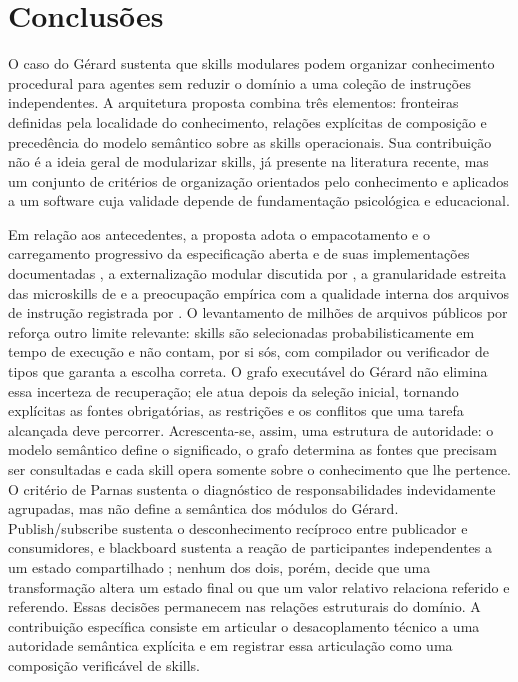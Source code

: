 \documentclass[preprint,12pt,authoryear]{elsarticle}
\newcommand{\gerard}{Gérard\xspace}
\begin{document}
\section{Conclusões}
O caso do \gerard{} sustenta que skills modulares podem organizar conhecimento procedural para agentes sem reduzir o domínio a uma coleção de instruções independentes. A arquitetura proposta combina três elementos: fronteiras definidas pela localidade do conhecimento, relações explícitas de composição e precedência do modelo semântico sobre as skills operacionais. Sua contribuição não é a ideia geral de modularizar skills, já presente na literatura recente, mas um conjunto de critérios de organização orientados pelo conhecimento e aplicados a um software cuja validade depende de fundamentação psicológica e educacional.

Em relação aos antecedentes, a proposta adota o empacotamento e o carregamento progressivo da especificação aberta e de suas implementações documentadas \citep{agentskills2026spec,openai2026skills,microsoft2026skills}, a externalização modular discutida por \citet{badhe2026survey}, a granularidade estreita das microskills de \citet{zare2026microskill} e a preocupação empírica com a qualidade interna dos arquivos de instrução registrada por \citet{hong2026smells}. O levantamento de milhões de arquivos públicos por \citet{destefanis2026gitskills} reforça outro limite relevante: skills são selecionadas probabilisticamente em tempo de execução e não contam, por si sós, com compilador ou verificador de tipos que garanta a escolha correta. O grafo executável do \gerard{} não elimina essa incerteza de recuperação; ele atua depois da seleção inicial, tornando explícitas as fontes obrigatórias, as restrições e os conflitos que uma tarefa alcançada deve percorrer. Acrescenta-se, assim, uma estrutura de autoridade: o modelo semântico define o significado, o grafo determina as fontes que precisam ser consultadas e cada skill opera somente sobre o conhecimento que lhe pertence. O critério de Parnas sustenta o diagnóstico de responsabilidades indevidamente agrupadas, mas não define a semântica dos módulos do \gerard \citep{parnas1972criteria}. Publish/subscribe sustenta o desconhecimento recíproco entre publicador e consumidores, e blackboard sustenta a reação de participantes independentes a um estado compartilhado \citep{eugster2003many,nii1986blackboard}; nenhum dos dois, porém, decide que uma transformação altera um estado final ou que um valor relativo relaciona referido e referendo. Essas decisões permanecem nas relações estruturais do domínio. A contribuição específica consiste em articular o desacoplamento técnico a uma autoridade semântica explícita e em registrar essa articulação como uma composição verificável de skills.
\end{document}
